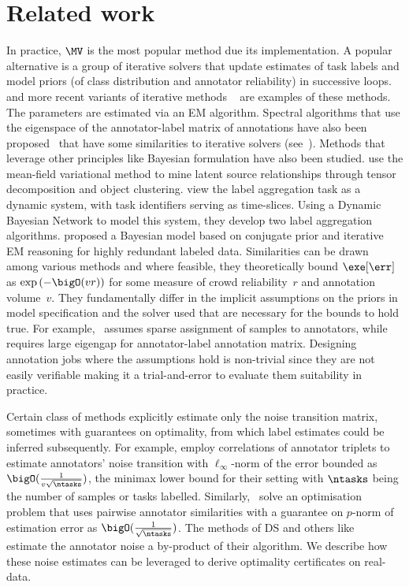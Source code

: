 \section{Related work}
\label{sec:related}
In practice, $\MV$ is the most popular method due its implementation.
A popular alternative is a group of iterative solvers that update estimates of task labels and model priors (of class distribution and annotator reliability) in successive loops.
\citet{dawid} and more recent variants  of iterative methods ~\citep{karger2014budget, li2014error, li2019truth, chen2023sample} are examples of these methods. The parameters are estimated via an EM algorithm. 
Spectral algorithms that use the eigenspace of the annotator-label matrix of annotations have also been proposed~\citep{ghosh, zhang2014spectral, pmlr-v151-tenzer22a} that have some similarities to iterative solvers (see~\citet{karger2014budget}).
Methods that leverage other principles like Bayesian formulation have also been studied. \citet{li2019exploiting} use the mean-field variational method to
mine latent source relationships through tensor decomposition and object clustering. 
\citet{yang2024lightweight} view the label aggregation task as a dynamic system, with task identifiers serving as time-slices. Using a Dynamic Bayesian Network to model this system, they develop two label aggregation algorithms.
\citet{li2019truth} proposed a Bayesian model based on conjugate prior and iterative EM reasoning for highly redundant labeled data.
Similarities can be drawn among various methods and where feasible, they theoretically bound $\exe[\err]$ as $\exp{(-\bigO(vr))}$ for some measure of crowd reliability~$r$ and annotation volume~$v$.
They fundamentally differ in the implicit assumptions on the priors in model specification and the solver used that are necessary for the bounds to hold true.
For example,~\citet{karger2014budget} assumes sparse assignment of samples to annotators, while~\citet{dalvi} requires large eigengap for annotator-label annotation matrix.
Designing annotation jobs where the assumptions hold is non-trivial since they are not easily verifiable making it a trial-and-error to evaluate them suitability in practice.

Certain class of methods explicitly estimate only the noise transition matrix, sometimes with guarantees on optimality, from which label estimates could be inferred subsequently.
For example, \citet{bonald} employ correlations of annotator triplets to estimate annotators' noise transition with $\ell_\infty$-norm of the error bounded as $\bigO(\frac{1}{v\sqrt{\ntasks}})$, the minimax lower bound for their setting with $\ntasks$ being the number of samples or tasks labelled.
Similarly,~\citet{bucarelli2023leveraging} solve an optimisation problem that uses pairwise annotator similarities with a guarantee on $p$-norm of estimation error as $\bigO(\frac{1}{\sqrt{\ntasks}})$.
The methods of DS and others like~\citet{li2019exploiting} estimate the annotator noise a by-product of their algorithm.
We describe how these noise estimates can be leveraged to derive optimality certificates on real-data.


